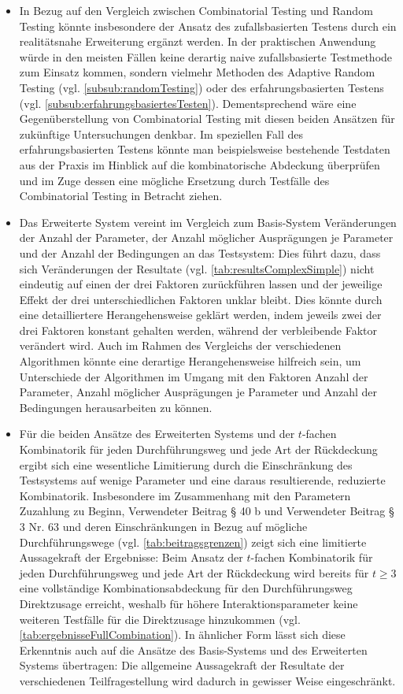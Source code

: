 \begin{itemize}
\item In Bezug auf den Vergleich zwischen Combinatorial Testing und Random Testing könnte insbesondere der Ansatz des zufallsbasierten Testens durch ein realitätsnahe Erweiterung ergänzt werden. In der praktischen Anwendung würde in den meisten Fällen keine derartig naive zufallsbasierte Testmethode zum Einsatz kommen, sondern vielmehr Methoden des Adaptive Random Testing (vgl. \autoref{subsub:randomTesting}) oder des erfahrungsbasierten Testens (vgl. \autoref{subsub:erfahrungsbasiertesTesten}). Dementsprechend wäre eine Gegenüberstellung von Combinatorial Testing mit diesen beiden Ansätzen für zukünftige Untersuchungen denkbar. Im speziellen Fall des erfahrungsbasierten Testens könnte man beispielsweise bestehende Testdaten aus der Praxis im Hinblick auf die kombinatorische Abdeckung überprüfen und im Zuge dessen eine mögliche Ersetzung durch Testfälle des Combinatorial Testing in Betracht ziehen.
\item Das Erweiterte System vereint im Vergleich zum Basis-System Veränderungen der Anzahl der Parameter, der Anzahl möglicher Ausprägungen je Parameter und der Anzahl der Bedingungen an das Testsystem: Dies führt dazu, dass sich Veränderungen der Resultate (vgl. \autoref{tab:resultsComplexSimple}) nicht eindeutig auf einen der drei Faktoren zurückführen lassen und der jeweilige Effekt der drei unterschiedlichen Faktoren unklar bleibt. Dies könnte durch eine detailliertere Herangehensweise geklärt werden, indem jeweils zwei der drei Faktoren konstant gehalten werden, während der verbleibende Faktor verändert wird. Auch im Rahmen des Vergleichs der verschiedenen Algorithmen könnte eine derartige Herangehensweise hilfreich sein, um Unterschiede der Algorithmen im Umgang mit den Faktoren Anzahl der Parameter, Anzahl möglicher Ausprägungen je Parameter und Anzahl der Bedingungen herausarbeiten zu können.
\item Für die beiden Ansätze des Erweiterten Systems und der $t$-fachen Kombinatorik für jeden Durchführungsweg und jede Art der Rückdeckung ergibt sich eine wesentliche Limitierung durch die Einschränkung des Testsystems auf wenige Parameter und eine daraus resultierende, reduzierte Kombinatorik. Insbesondere im Zusammenhang mit den Parametern Zuzahlung zu Beginn, Verwendeter Beitrag § 40 b und Verwendeter Beitrag § 3 Nr. 63 und deren Einschränkungen in Bezug auf mögliche Durchführungswege (vgl. \autoref{tab:beitragsgrenzen}) zeigt sich eine limitierte Aussagekraft der Ergebnisse: Beim Ansatz der $t$-fachen Kombinatorik für jeden Durchführungsweg und jede Art der Rückdeckung wird bereits für $t \geq 3$ eine vollständige Kombinationsabdeckung für den Durchführungsweg Direktzusage erreicht, weshalb für höhere Interaktionsparameter keine weiteren Testfälle für die Direktzusage hinzukommen (vgl. \autoref{tab:ergebnisseFullCombination}). In ähnlicher Form lässt sich diese Erkenntnis auch auf die Ansätze des Basis-Systems und des Erweiterten Systems übertragen: Die allgemeine Aussagekraft der Resultate der verschiedenen Teilfragestellung wird dadurch in gewisser Weise eingeschränkt.
\end{itemize}